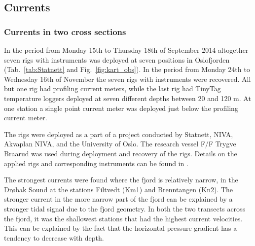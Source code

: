 \clearpage

\subsection{Currents}

\subsubsection{Currents in two cross sections}
In the period from Monday 15th to Thursday 18th of September 2014 altogether seven rigs with instruments was deployed at seven positions in Oslofjorden (Tab.~\ref{tab:Statnett} and Fig.~\ref{fig:kart_obs}). In the period from Monday 24th to Wednesday 16th of November the seven rigs with instruments were recovered. All but one rig had profiling current meters, while the last rig had TinyTag temperature loggers deployed at seven different depths between 20 and 120 m. At one station a single point current meter was deployed just below the profiling current meter. 

The rigs were deployed as a part of a project conducted by Statnett, NIVA, Akvaplan NIVA, and the University of Oslo. The research vessel F/F Trygve Braarud was used during deployment and recovery of the rigs. Details on the applied rigs and corresponding instruments can be found in \cite{staalstrom:2015}.

The strongest currents were found where the fjord is relatively narrow, in the Dr{\o}bak Sound at the stations Filtvedt (Km1) and Brenntangen (Kn2). The stronger current in the more narrow part of the fjord can be explained by a stronger tidal signal due to the fjord geometry. In both the two transects across the fjord, it was the shallowest stations that had the highest current velocities. This can be explained by the fact that the horizontal pressure gradient has a tendency to decrease with depth.

